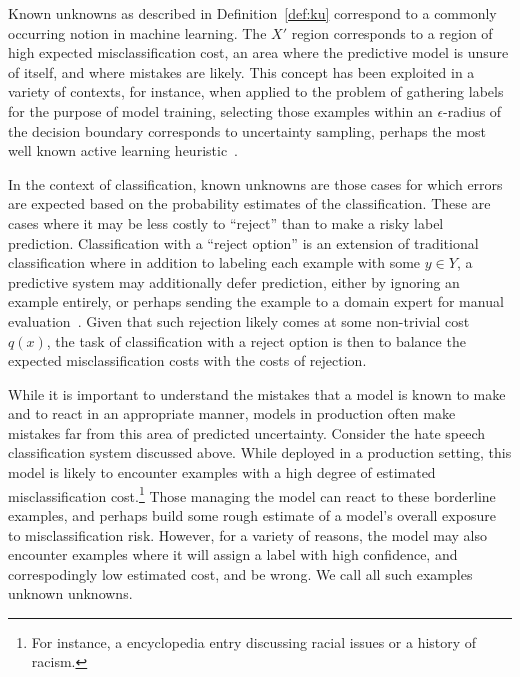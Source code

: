 Known unknowns as described in Definition~\ref{def:ku} correspond to a commonly occurring notion in machine learning. The $X'$ region corresponds to a region of high expected misclassification cost, an area where the predictive model is unsure of itself, and where mistakes are likely. This concept has been exploited in a variety of contexts, for instance, when applied to the problem of gathering labels for the purpose of model training, selecting those examples within an $\epsilon$-radius of the decision boundary corresponds to uncertainty sampling, perhaps the most well known active learning heuristic~\cite{lewis94sequential}.

In the context of classification, known unknowns are those cases for which errors are expected based on the probability estimates of the classification.   These are cases where it may be less costly to ``reject'' than to make a risky label prediction.  Classification with a ``reject option'' is an extension of traditional classification where in addition to labeling each example with some $y \in Y$, a predictive system may additionally defer prediction, either by ignoring an example entirely, or perhaps sending the example to a domain expert for manual evaluation~\cite{chow:57,chow:70}. Given that such rejection likely comes at some non-trivial cost $q(x)$, the task of classification with a reject option is then to balance the expected misclassification costs with the costs of rejection.  


While it is important to understand the mistakes that a model is known to make and to react in an appropriate manner, models in production often make mistakes far from this area of predicted uncertainty. Consider the hate speech classification system discussed above. While deployed in a production setting, this model is likely to encounter examples with a high degree of estimated misclassification cost.\footnote{For instance, a encyclopedia entry discussing racial issues or a history of racism.} Those managing the model can react to these borderline examples, and perhaps build some rough estimate of a model's overall exposure to misclassification risk. However, for a variety of reasons, the model may also encounter examples where it will assign a label with high confidence, and correspodingly low estimated cost, and be wrong. We call all such examples unknown unknowns.

